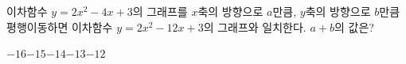 이차함수 $y=2x^2-4x+3$의 그래프를 $x$축의 방향으로 $a$만큼, $y$축의 방향으로 $b$만큼 평행이동하면 이차함수 $y=2x^2-12x+3$의 그래프와 일치한다. $a+b$의 값은?
\begin{choices32}{$-16$}{$-15$}{$-14$}{$-13$}{$-12$}\end{choices32}
